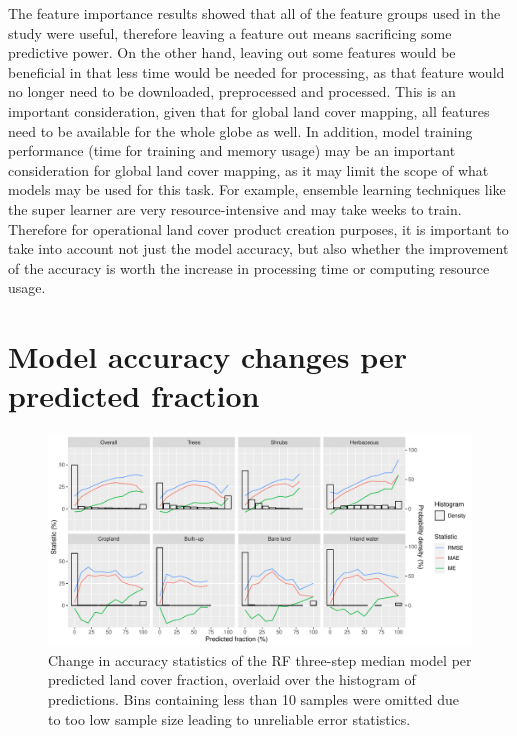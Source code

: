 \documentclass[review,authoryear,3p]{elsarticle}
\begin{document}
The feature importance results showed that all of the feature groups used in the study were useful, therefore leaving a feature out means sacrificing some predictive power.
On the other hand, leaving out some features would be beneficial in that less time would be needed for processing, as that feature would no longer need to be downloaded, preprocessed and processed.
This is an important consideration, given that for global land cover mapping, all features need to be available for the whole globe as well.
In addition, model training performance (time for training and memory usage) may be an important consideration for global land cover mapping, as it may limit the scope of what models may be used for this task.
For example, ensemble learning techniques like the super learner are very resource-intensive and may take weeks to train.
Therefore for operational land cover product creation purposes, it is important to take into account not just the model accuracy, but also whether the improvement of the accuracy is worth the increase in processing time or computing resource usage.

\section{Model accuracy changes per predicted fraction} \label{sec-apu}

\begin{figure}[h!]
    \centering
    \includegraphics[width=\textwidth]{article-figures/apuplots/2021-01-13-apu-rf3step.pdf}
    \caption{Change in accuracy statistics of the \gls{RF} three-step median model per predicted land cover fraction, overlaid over the histogram of predictions. Bins containing less than 10 samples were omitted due to too low sample size leading to unreliable error statistics.}
    \label{fig-apu}
\end{figure}

\newpage
\listoffigures
\end{document}
